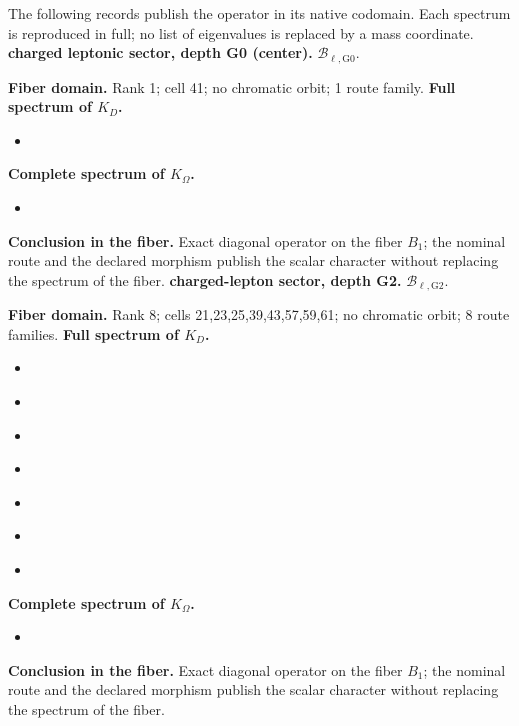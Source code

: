 \begingroup
\small
\setlength{\parskip}{.12\baselineskip}
\let\texttt\textnormal
The following records publish the operator in its native codomain. Each spectrum is reproduced in full; no list of eigenvalues is replaced by a mass coordinate.
\noindent\textbf{charged leptonic sector, depth G0 (center).} \(\mathcal B_{\ell,\mathrm{G0}}\).\par
\noindent\textbf{Fiber domain.} Rank 1; cell 41; no chromatic orbit; 1 route family.
\noindent\textbf{Full spectrum of \(K_D\).}
\begin{itemize}
\item \texttt{}
\end{itemize}
\noindent\textbf{Complete spectrum of \(K_\Omega\).}
\begin{itemize}
\item \texttt{}
\end{itemize}
\noindent\textbf{Conclusion in the fiber.} Exact diagonal operator on the fiber \(B_1\); the nominal route and the declared morphism publish the scalar character without replacing the spectrum of the fiber.
\medskip
{}
\noindent\textbf{charged-lepton sector, depth G2.} \(\mathcal B_{\ell,\mathrm{G2}}\).\par
\noindent\textbf{Fiber domain.} Rank 8; cells 21,23,25,39,43,57,59,61; no chromatic orbit; 8 route families.
\noindent\textbf{Full spectrum of \(K_D\).}
\begin{itemize}
\item \texttt{}
\item \texttt{}
\item \texttt{}
\item \texttt{}
\item \texttt{}
\item \texttt{}
\item \texttt{}
\end{itemize}
\noindent\textbf{Complete spectrum of \(K_\Omega\).}
\begin{itemize}
\item \texttt{}
\end{itemize}
\noindent\textbf{Conclusion in the fiber.} Exact diagonal operator on the fiber \(B_1\); the nominal route and the declared morphism publish the scalar character without replacing the spectrum of the fiber.
